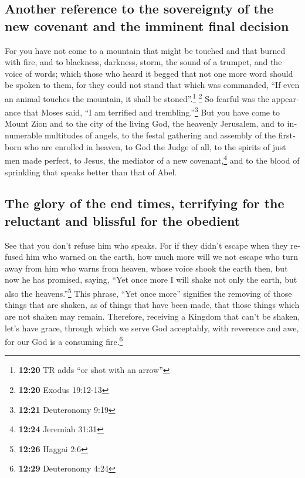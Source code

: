 \begin{paracol}{2}
\begin{otherlanguage}{english}
\hypertarget{another-reference-to-the-sovereignty-of-the-new-covenant-and-the-imminent-final-decision}{%
\subsection{Another reference to the sovereignty of the new covenant and
the imminent final
decision}\label{another-reference-to-the-sovereignty-of-the-new-covenant-and-the-imminent-final-decision}}

 For you have not come to a mountain that might be
touched and that burned with fire, and to blackness, darkness, storm,
 the sound of a trumpet, and the voice of words; which
those who heard it begged that not one more word should be spoken to
them,  for they could not stand that which was commanded,
``If even an animal touches the mountain, it shall be
stoned''.\footnote{\textbf{12:20} TR adds ``or shot with an arrow''}
\footnote{\textbf{12:20} Exodus 19:12-13}  So fearful was
the appearance that Moses said, ``I am terrified and
trembling.''\footnote{\textbf{12:21} Deuteronomy 9:19} 
But you have come to Mount Zion and to the city of the living God, the
heavenly Jerusalem, and to innumerable multitudes of angels,
 to the festal gathering and assembly of the firstborn
who are enrolled in heaven, to God the Judge of all, to the spirits of
just men made perfect,  to Jesus, the mediator of a new
covenant,\footnote{\textbf{12:24} Jeremiah 31:31} and to the blood of
sprinkling that speaks better than that of Abel.

\hypertarget{the-glory-of-the-end-times-terrifying-for-the-reluctant-and-blissful-for-the-obedient}{%
\subsection{The glory of the end times, terrifying for the reluctant and
blissful for the
obedient}\label{the-glory-of-the-end-times-terrifying-for-the-reluctant-and-blissful-for-the-obedient}}

 See that you don't refuse him who speaks. For if they
didn't escape when they refused him who warned on the earth, how much
more will we not escape who turn away from him who warns from heaven,
 whose voice shook the earth then, but now he has
promised, saying, ``Yet once more I will shake not only the earth, but
also the heavens.''\footnote{\textbf{12:26} Haggai 2:6} 
This phrase, ``Yet once more'' signifies the removing of those things
that are shaken, as of things that have been made, that those things
which are not shaken may remain.  Therefore, receiving a
Kingdom that can't be shaken, let's have grace, through which we serve
God acceptably, with reverence and awe,  for our God is a
consuming fire.\footnote{\textbf{12:29} Deuteronomy 4:24}


\end{otherlanguage}
\end{paracol}

